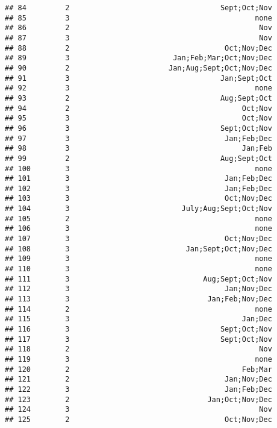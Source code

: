 \documentclass[
]{article}
\begin{document}
\begin{verbatim}
## 84         2                                   Sept;Oct;Nov
## 85         3                                           none
## 86         2                                            Nov
## 87         3                                            Nov
## 88         2                                    Oct;Nov;Dec
## 89         3                        Jan;Feb;Mar;Oct;Nov;Dec
## 90         2                       Jan;Aug;Sept;Oct;Nov;Dec
## 91         3                                   Jan;Sept;Oct
## 92         3                                           none
## 93         2                                   Aug;Sept;Oct
## 94         2                                        Oct;Nov
## 95         3                                        Oct;Nov
## 96         3                                   Sept;Oct;Nov
## 97         3                                    Jan;Feb;Dec
## 98         3                                        Jan;Feb
## 99         2                                   Aug;Sept;Oct
## 100        3                                           none
## 101        3                                    Jan;Feb;Dec
## 102        3                                    Jan;Feb;Dec
## 103        3                                    Oct;Nov;Dec
## 104        3                          July;Aug;Sept;Oct;Nov
## 105        2                                           none
## 106        3                                           none
## 107        3                                    Oct;Nov;Dec
## 108        3                           Jan;Sept;Oct;Nov;Dec
## 109        3                                           none
## 110        3                                           none
## 111        3                               Aug;Sept;Oct;Nov
## 112        3                                    Jan;Nov;Dec
## 113        3                                Jan;Feb;Nov;Dec
## 114        2                                           none
## 115        3                                        Jan;Dec
## 116        3                                   Sept;Oct;Nov
## 117        3                                   Sept;Oct;Nov
## 118        2                                            Nov
## 119        3                                           none
## 120        2                                        Feb;Mar
## 121        2                                    Jan;Nov;Dec
## 122        3                                    Jan;Feb;Dec
## 123        2                                Jan;Oct;Nov;Dec
## 124        3                                            Nov
## 125        2                                    Oct;Nov;Dec

\end{verbatim}
\end{document}
